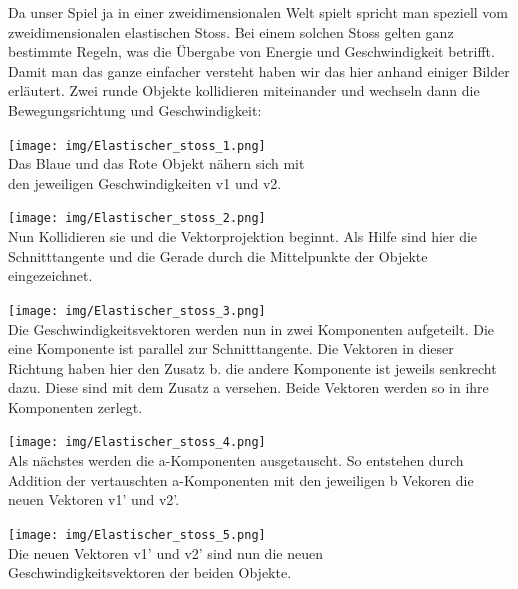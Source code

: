 \documentclass[12pt,a4paper]{scrartcl}
\begin{document}
Da unser Spiel ja in einer zweidimensionalen Welt spielt spricht man speziell vom zweidimensionalen elastischen Stoss.
Bei einem solchen Stoss gelten ganz bestimmte Regeln, was die Übergabe von Energie und Geschwindigkeit betrifft.
Damit man das ganze einfacher versteht haben wir das hier anhand einiger Bilder erläutert.
Zwei runde Objekte kollidieren miteinander und wechseln dann die Bewegungsrichtung und Geschwindigkeit:



\begin{center}
\texttt{[image: img/Elastischer\_stoss\_1.png]} \\
Das Blaue und das Rote Objekt nähern sich mit \\den jeweiligen Geschwindigkeiten v1 und v2.
\end{center}

\begin{center}
\texttt{[image: img/Elastischer\_stoss\_2.png]} \\
Nun Kollidieren sie und die Vektorprojektion beginnt. Als Hilfe sind hier die Schnitttangente und die Gerade durch die Mittelpunkte der Objekte eingezeichnet.
\end{center}

\begin{center}
\texttt{[image: img/Elastischer\_stoss\_3.png]} \\
Die Geschwindigkeitsvektoren werden nun in zwei Komponenten aufgeteilt. Die eine Komponente ist parallel zur Schnitttangente. Die Vektoren in dieser Richtung haben hier den Zusatz b.
die andere Komponente ist jeweils senkrecht dazu.
Diese sind mit dem Zusatz a versehen.
Beide Vektoren werden so in ihre Komponenten zerlegt.
\end{center}

\begin{center}
\texttt{[image: img/Elastischer\_stoss\_4.png]} \\
Als nächstes werden die a-Komponenten ausgetauscht.
So entstehen durch Addition der vertauschten a-Komponenten mit den jeweiligen b Vekoren die neuen Vektoren v1' und v2'.
\end{center}

\begin{center}
\texttt{[image: img/Elastischer\_stoss\_5.png]} \\
Die neuen Vektoren v1' und v2' sind nun die neuen\\ Geschwindigkeitsvektoren der beiden Objekte.
\end{center}
\end{document}
